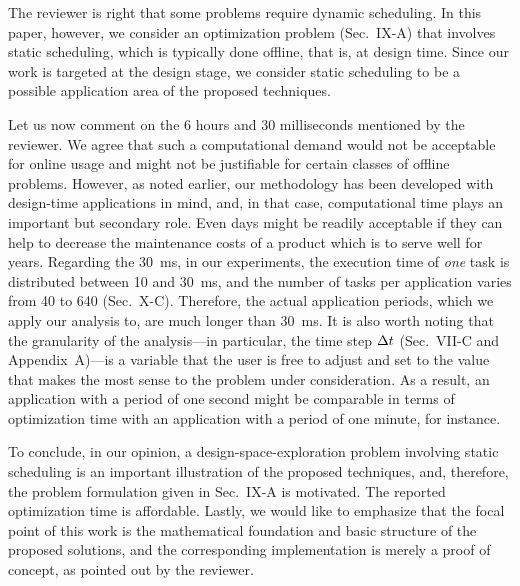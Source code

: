 \begin{authors}
The reviewer is right that some problems require dynamic scheduling. In this
paper, however, we consider an optimization problem (Sec.~IX-A) that involves
static scheduling, which is typically done offline, that is, at design time.
Since our work is targeted at the design stage, we consider static scheduling
to be a possible application area of the proposed techniques.

Let us now comment on the 6 hours and 30 milliseconds mentioned by the reviewer.
We agree that such a computational demand would not be acceptable for online
usage and might not be justifiable for certain classes of offline problems.
However, as noted earlier, our methodology has been developed with design-time
applications in mind, and, in that case, computational time plays an important
but secondary role. Even days might be readily acceptable if they can help to
decrease the maintenance costs of a product which is to serve well for years.
Regarding the 30~ms, in our experiments, the execution time of \emph{one} task
is distributed between 10 and 30~ms, and the number of tasks per application
varies from 40 to 640 (Sec.~X-C). Therefore, the actual application periods,
which we apply our analysis to, are much longer than 30~ms. It is also worth
noting that the granularity of the analysis---in particular, the time step $\Delta t$
(Sec.~VII-C and Appendix~A)---is a variable that the user is free to adjust and
set to the value that makes the most sense to the problem under consideration.
As a result, an application with a period of one second might be comparable in
terms of optimization time with an application with a period of one minute, for
instance.

To conclude, in our opinion, a design-space-exploration problem involving static
scheduling is an important illustration of the proposed techniques, and,
therefore, the problem formulation given in Sec.~IX-A is motivated. The reported
optimization time is affordable. Lastly, we would like to emphasize that the
focal point of this work is the mathematical foundation and basic structure of
the proposed solutions, and the corresponding implementation is merely a proof
of concept, as pointed out by the reviewer.

\begin{actions}
\end{actions}
\end{authors}

